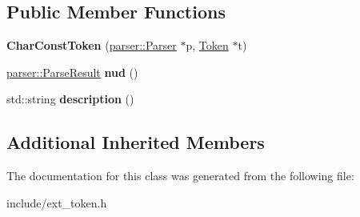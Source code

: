\subsection*{Public Member Functions}
\begin{DoxyCompactItemize}
\item 
{\bfseries Char\+Const\+Token} (\hyperlink{classfcal_1_1parser_1_1Parser}{parser\+::\+Parser} $\ast$p, \hyperlink{classfcal_1_1scanner_1_1Token}{Token} $\ast$t)\hypertarget{classfcal_1_1scanner_1_1CharConstToken_ae108041381482344ee7cf3bf0629fbba}{}\label{classfcal_1_1scanner_1_1CharConstToken_ae108041381482344ee7cf3bf0629fbba}

\item 
\hyperlink{classfcal_1_1parser_1_1ParseResult}{parser\+::\+Parse\+Result} {\bfseries nud} ()\hypertarget{classfcal_1_1scanner_1_1CharConstToken_a5e9299e684f969cde0f71c0041e92153}{}\label{classfcal_1_1scanner_1_1CharConstToken_a5e9299e684f969cde0f71c0041e92153}

\item 
std\+::string {\bfseries description} ()\hypertarget{classfcal_1_1scanner_1_1CharConstToken_a283d5fb12d36caac1afed73c1035b562}{}\label{classfcal_1_1scanner_1_1CharConstToken_a283d5fb12d36caac1afed73c1035b562}

\end{DoxyCompactItemize}
\subsection*{Additional Inherited Members}


The documentation for this class was generated from the following file\+:\begin{DoxyCompactItemize}
\item 
include/ext\+\_\+token.\+h\end{DoxyCompactItemize}
